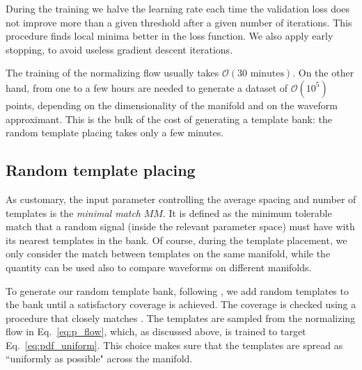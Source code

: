 \documentclass[twocolumn,showpacs,preprintnumbers,nofootinbib,prd,
superscriptaddress,10pt]{revtex4-2}
\begin{document}
During the training we halve the learning rate each time the validation loss does not improve more than a given threshold after a given number of iterations. This procedure finds local minima better in the loss function. We also apply early stopping, to avoid useless gradient descent iterations.

The training of the normalizing flow usually takes $\mathcal{O}(30 \text{ minutes})$. On the other hand, from one to a few hours are needed to generate a dataset of $\mathcal{O}(10^5)$ points, depending on the dimensionality of the manifold and on the waveform approximant.
This is the bulk of the cost of generating a template bank: the random template placing takes only a few minutes.

\subsection{Random template placing} \label{sec:template_placing}

As customary, the input parameter controlling the average spacing and number of templates is the {\it minimal match} $MM$. It is defined as the minimum tolerable match that a random signal (inside the relevant parameter space) must have with its nearest templates in the bank.
Of course, during the template placement, we only consider the match between templates on the same manifold, while the quantity can be used also to compare waveforms on different manifolds.

To generate our random template bank, following \cite{Messenger:2008ta}, we add random templates to the bank until a satisfactory coverage is achieved. The coverage is checked using a procedure that closely matches \cite{Coogan:2022qxs}.
The templates are sampled from the normalizing flow in Eq.~\eqref{eq:p_flow}, which, as discussed above, is trained to target Eq.~\eqref{eq:pdf_uniform}. This choice makes sure that the templates are spread as ``uniformly as possible" across the manifold.
\end{document}
